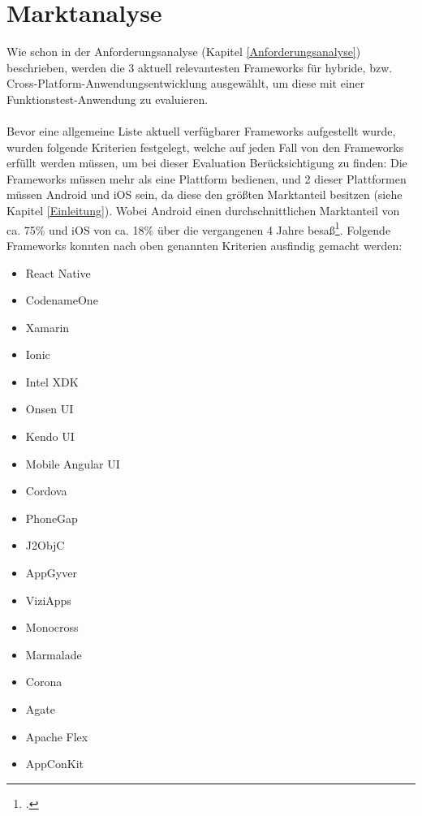 \chapter{Marktanalyse} \label{Marktanalyse}

Wie schon in der Anforderungsanalyse (Kapitel \ref{Anforderungsanalyse}) beschrieben, werden die 3 aktuell relevantesten Frameworks für hybride, bzw. Cross-Platform-Anwendungsentwicklung ausgewählt, um diese mit einer Funktionstest-Anwendung zu evaluieren.
\\
\\
Bevor eine allgemeine Liste aktuell verfügbarer Frameworks aufgestellt wurde, wurden folgende Kriterien festgelegt, welche auf jeden Fall von den Frameworks erfüllt werden müssen, um bei dieser Evaluation Berücksichtigung zu finden: Die Frameworks müssen mehr als eine Plattform bedienen, und 2 dieser Plattformen müssen Android und iOS sein, da diese den größten Marktanteil besitzen (siehe Kapitel \ref{Einleitung}). Wobei Android einen durchschnittlichen Marktanteil von ca. 75\% und iOS von ca. 18\% über die vergangenen 4 Jahre besaß\footcite{Statista}.
Folgende Frameworks konnten nach oben genannten Kriterien ausfindig gemacht werden:
\\
\begin{itemize}
\item React Native
\item CodenameOne
\item Xamarin
\item Ionic
\item Intel XDK
\item Onsen UI
\item Kendo UI
\item Mobile Angular UI
\item Cordova
\item PhoneGap
\item J2ObjC
\item AppGyver
\item ViziApps
\item Monocross
\item Marmalade
\item Corona
\item Agate
\item Apache Flex
\item AppConKit
\end{itemize}

